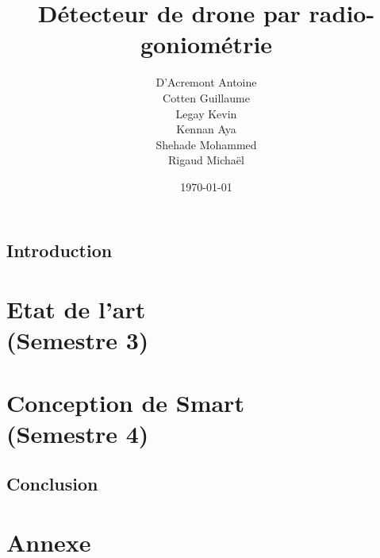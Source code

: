 \documentclass[a4paper, 11pt, oneside, oldfontcommands]{memoir}
\title{Détecteur de drone par radio-goniométrie}
\author{D'Acremont Antoine\\Cotten Guillaume\\Legay Kevin\\Kennan Aya\\Shehade Mohammed\\Rigaud Michaël}
\date{\today}
\newcounter{rem}[chapter]
\newcounter{th}[chapter]
\begin{document}
\maketitle
\thispagestyle{empty}
\newpage

\tableofcontents





\chapter*{Introduction}


\newpage	  

\part{Etat de l'art \\(Semestre 3)}







%
%

\part{Conception de Smart \\(Semestre 4)}








\chapter*{Conclusion}
\newpage


\part*{Annexe}
\appendix
\nocite{*}







\newpage
 \listoffigures
 \printindex
 
  
\end{document}
